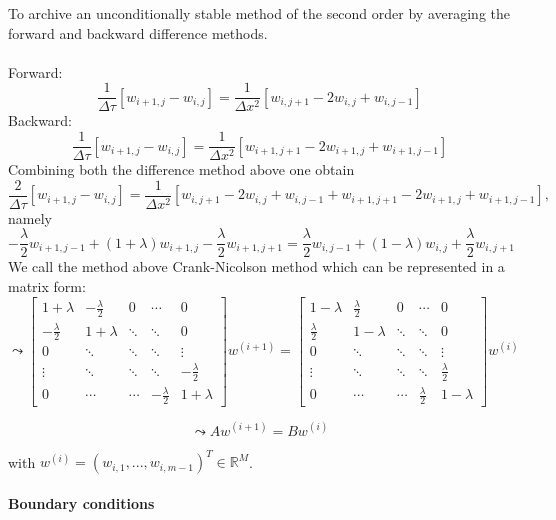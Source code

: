 \documentclass{article}
\begin{document}
To archive an unconditionally stable method of the second order by averaging the forward and backward difference methods.\\\\
Forward:
$$
\frac{1}{\Delta \tau}[w_{i+1,j}-w_{i,j}] = \frac{1}{\Delta x^2}[w_{i,j+1}-2w_{i,j}+w_{i,j-1}]
$$
Backward:
$$
\frac{1}{\Delta \tau}[w_{i+1,j}-w_{i,j}] = \frac{1}{\Delta x^2}[w_{i+1,j+1}-2w_{i+1,j}+w_{i+1,j-1}]
$$
Combining both the difference method above one obtain
$$
\frac{2}{\Delta \tau}[w_{i+1,j} - w_{i,j}]= \frac{1}{\Delta x^2}[w_{i,j+1}-2w_{i,j}+w_{i,j-1}+w_{i+1,j+1} - 2w_{i+1,j}+w_{i+1,j-1}],
$$
namely
$$
-\frac{\lambda}{2} w_{i+1,j-1}+(1+\lambda) w_{i+1,j} - \frac{\lambda}{2}w_{i+1,j+1} = \frac{\lambda}{2}w_{i,j-1}+(1-\lambda)w_{i,j} + \frac{\lambda}{2}w_{i,j+1}
$$
We call the method above Crank-Nicolson method which can be represented in a matrix form:
$$
\leadsto \begin{bmatrix}
1+\lambda  & -\frac{\lambda}{2}  & 0  & \cdots & 0 \\ 
-\frac{\lambda}{2} &1+\lambda  & \ddots  &\ddots   & 0\\ 
 0& \ddots  & \ddots  & \ddots  & \vdots \\ 
 \vdots & \ddots  & \ddots  &\ddots   & -\frac{\lambda}{2}\\ 
 0& \cdots  &\cdots   &-\frac{\lambda}{2}  & 1+\lambda
\end{bmatrix}w^{(i+1)} = \begin{bmatrix}
1-\lambda  & \frac{\lambda}{2}  & 0  & \cdots & 0 \\ 
\frac{\lambda}{2} &1-\lambda  & \ddots  &\ddots   & 0\\ 
 0& \ddots  & \ddots  & \ddots  & \vdots \\ 
 \vdots & \ddots  & \ddots  &\ddots   & \frac{\lambda}{2}\\ 
 0& \cdots  &\cdots   &\frac{\lambda}{2}  & 1-\lambda
\end{bmatrix}w^{(i)}
$$

$$
\leadsto Aw^{(i+1)} = Bw^{(i)}
$$

with $ w^{(i)} = (w_{i,1}, ... , w_{i, m-1})^T \in \mathbb{R}^M $.\\\\
\textbf{Boundary conditions}\\
\end{document}
